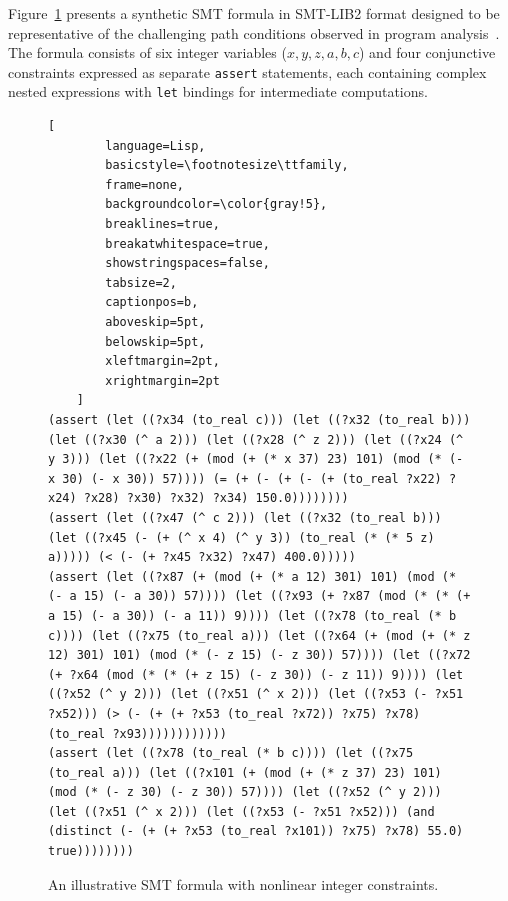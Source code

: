 Figure~\ref{fig:motivating-smt-lib} presents a synthetic SMT formula in SMT-LIB2 format designed to be representative of the challenging path conditions observed in program analysis~\cite{cadar2013symbolic}. The formula consists of six integer variables ($x, y, z, a, b, c$) and four conjunctive constraints expressed as separate \texttt{assert} statements, each containing complex nested expressions with \texttt{let} bindings for intermediate computations.
\begin{figure}[t]
    \centering
    \captionsetup{skip=2pt}
    \begin{lstlisting}[
        language=Lisp,
        basicstyle=\footnotesize\ttfamily,
        frame=none,
        backgroundcolor=\color{gray!5},
        breaklines=true,
        breakatwhitespace=true,
        showstringspaces=false,
        tabsize=2,
        captionpos=b,
        aboveskip=5pt,
        belowskip=5pt,
        xleftmargin=2pt,
        xrightmargin=2pt
    ]
(assert (let ((?x34 (to_real c))) (let ((?x32 (to_real b))) (let ((?x30 (^ a 2))) (let ((?x28 (^ z 2))) (let ((?x24 (^ y 3))) (let ((?x22 (+ (mod (+ (* x 37) 23) 101) (mod (* (- x 30) (- x 30)) 57)))) (= (+ (- (+ (- (+ (to_real ?x22) ?x24) ?x28) ?x30) ?x32) ?x34) 150.0))))))))
(assert (let ((?x47 (^ c 2))) (let ((?x32 (to_real b))) (let ((?x45 (- (+ (^ x 4) (^ y 3)) (to_real (* (* 5 z) a))))) (< (- (+ ?x45 ?x32) ?x47) 400.0)))))
(assert (let ((?x87 (+ (mod (+ (* a 12) 301) 101) (mod (* (- a 15) (- a 30)) 57)))) (let ((?x93 (+ ?x87 (mod (* (* (+ a 15) (- a 30)) (- a 11)) 9)))) (let ((?x78 (to_real (* b c)))) (let ((?x75 (to_real a))) (let ((?x64 (+ (mod (+ (* z 12) 301) 101) (mod (* (- z 15) (- z 30)) 57)))) (let ((?x72 (+ ?x64 (mod (* (* (+ z 15) (- z 30)) (- z 11)) 9)))) (let ((?x52 (^ y 2))) (let ((?x51 (^ x 2))) (let ((?x53 (- ?x51 ?x52))) (> (- (+ (+ ?x53 (to_real ?x72)) ?x75) ?x78) (to_real ?x93))))))))))))
(assert (let ((?x78 (to_real (* b c)))) (let ((?x75 (to_real a))) (let ((?x101 (+ (mod (+ (* z 37) 23) 101) (mod (* (- z 30) (- z 30)) 57)))) (let ((?x52 (^ y 2))) (let ((?x51 (^ x 2))) (let ((?x53 (- ?x51 ?x52))) (and (distinct (- (+ (+ ?x53 (to_real ?x101)) ?x75) ?x78) 55.0) true))))))))
    \end{lstlisting}
    \caption{An illustrative SMT formula with nonlinear integer constraints.}
    \label{fig:motivating-smt-lib}
    \end{figure}
